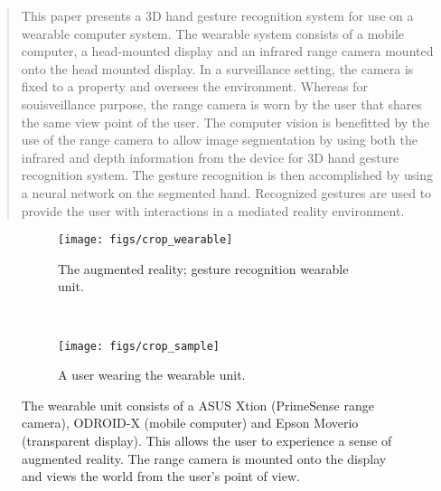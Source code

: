 \documentclass[conference]{IEEEtran}
\begin{document}




\maketitle

\begin{abstract}
This paper presents a 3D hand gesture recognition system for use on a wearable computer system. The wearable system consists of a mobile computer, a head-mounted display and an infrared range camera mounted onto the head mounted display. In a surveillance setting, the camera is fixed to a property and oversees the environment. Whereas for souisveillance purpose, the range camera is worn by the user that shares the same view point of the user. The computer vision is benefitted by the use of the range camera to allow image segmentation by using both the infrared and depth information from the device for 3D hand gesture recognition system. The gesture recognition is then accomplished by using a neural network on the segmented hand. Recognized gestures are used to provide the user with interactions in a mediated reality environment.
\end{abstract}





%
\IEEEpeerreviewmaketitle

\begin{figure}
\centering
\begin{subfigure}[b]{0.7\columnwidth}
\centering
\texttt{[image: figs/crop\_wearable]}
\caption{The augmented reality; gesture recognition wearable unit.}
\label{wearable}
\end{subfigure}
\\
\vspace{5pt}
\begin{subfigure}[b]{\columnwidth}
\centering
\texttt{[image: figs/crop\_sample]}
\caption{A user wearing the wearable unit.}
\label{user_wearable}
\end{subfigure}
\caption{The wearable unit consists of a ASUS Xtion (PrimeSense range camera), ODROID-X (mobile computer) and Epson Moverio (transparent display). This allows the user to experience a sense of augmented reality. The range camera is mounted onto the display and views the world from the user's point of view.}
\end{figure}
\end{document}
